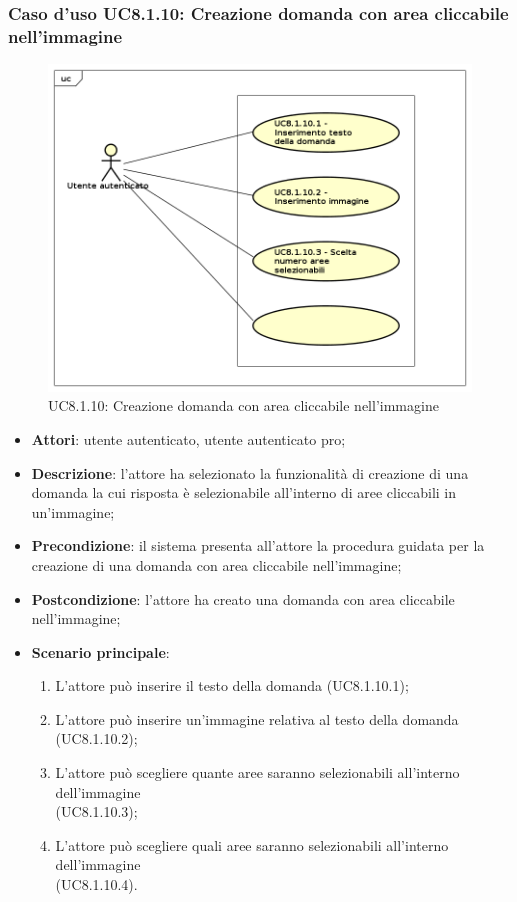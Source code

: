 \subsubsection{Caso d'uso UC8.1.10: Creazione domanda con area cliccabile nell'immagine}
\label{UC8.1.10}
\begin{figure}[h]
	\centering
	\includegraphics[scale=0.5,keepaspectratio]{UML/UC8_1_10.png}
	\caption{UC8.1.10: Creazione domanda con area cliccabile nell'immagine}
\end{figure}
\FloatBarrier
\begin{itemize}
	\item \textbf{Attori}: utente autenticato, utente autenticato pro;
	\item \textbf{Descrizione}: l'attore ha selezionato la funzionalità di creazione di una domanda la cui risposta è selezionabile all'interno di aree cliccabili in un'immagine;
	\item \textbf{Precondizione}: il sistema presenta all'attore la procedura guidata per la creazione di una domanda con area cliccabile nell'immagine;
	\item \textbf{Postcondizione}: l'attore ha creato una domanda con area cliccabile nell'immagine;
	\item \textbf{Scenario principale}:
		\begin{enumerate}
	       	\item L'attore può inserire il testo della domanda (UC8.1.10.1);
	        \item L'attore può inserire un'immagine relativa al testo della domanda (UC8.1.10.2);
		\item L'attore può scegliere quante aree saranno selezionabili all'interno dell'immagine \\(UC8.1.10.3);
		\item L'attore può scegliere quali aree saranno selezionabili all'interno dell'immagine \\(UC8.1.10.4).
	 	\end{enumerate}
\end{itemize}

